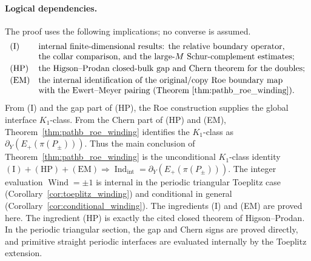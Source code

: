\documentclass[11pt]{article}
\numberwithin{equation}{section}
\theoremstyle{definition}
\theoremstyle{remark}
\newcommand{\Indint}{\operatorname{Ind}_{\mathrm{int}}}
\begin{document}
\paragraph{Logical dependencies.}
The proof uses the following implications; no converse is assumed.
\[
\begin{array}{ll}
\mathrm{(I)} & \text{internal finite-dimensional results: the relative boundary operator,}\\
& \text{the collar comparison, and the large-\(M\) Schur-complement estimates;}\\[0.2em]
\mathrm{(HP)} & \text{the Higson--Prodan closed-bulk gap and Chern theorem for the doubles;}\\[0.2em]
\mathrm{(EM)} & \text{the internal identification of the original/copy Roe boundary map}\\
& \text{with the Ewert--Meyer pairing (Theorem~\ref{thm:pathb_roe_winding}).}
\end{array}
\]
From (I) and the gap part of (HP), the Roe construction supplies the global interface
\(K_1\)-class. From the Chern part of (HP) and (EM), Theorem~\ref{thm:pathb_roe_winding}
identifies the \(K_1\)-class as \(\partial_Y(E_+(\pi(P_\pm)))\). Thus the main conclusion
of Theorem~\ref{thm:pathb_roe_winding} is the unconditional
\(K_1\)-class identity
\(\mathrm{(I)}+\mathrm{(HP)}+\mathrm{(EM)}\Longrightarrow
\Indint=\partial_Y(E_+(\pi(P_\pm)))\). The integer evaluation
\(\operatorname{Wind}=\pm1\) is internal in the periodic triangular Toeplitz case
(Corollary~\ref{cor:toeplitz_winding}) and conditional in general
(Corollary~\ref{cor:conditional_winding}). The ingredients (I) and (EM) are proved here. The
ingredient (HP) is exactly the cited closed theorem of Higson--Prodan. In the periodic
triangular section, the gap and Chern signs are proved directly, and primitive straight
periodic interfaces are evaluated internally by the Toeplitz extension.
\end{document}
